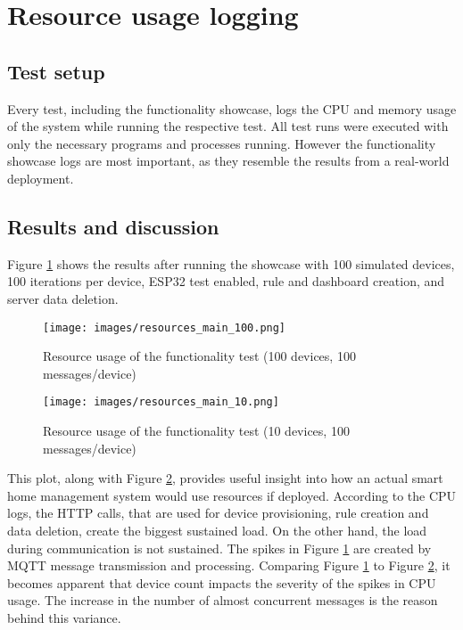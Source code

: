 \section{Resource usage logging}\label{chap:stat_log}
\subsection{Test setup}
Every test, including the functionality showcase, logs the CPU and memory usage of the system while running the respective test. All test runs were executed with only the necessary programs and processes running. However the functionality showcase logs are most important, as they resemble the results from a real-world deployment.

\subsection{Results and discussion}
Figure \ref{fig:resources_main_100} shows the results after running the showcase with 100 simulated devices, 100 iterations per device, ESP32 test enabled, rule and dashboard creation, and server data deletion. 

\begin{figure}[ht]
    \centering
    \texttt{[image: images/resources\_main\_100.png]}
    \caption{Resource usage of the functionality test (100 devices, 100 messages/device)}
    \label{fig:resources_main_100}
\end{figure}


\begin{figure}[ht]
    \centering
    \texttt{[image: images/resources\_main\_10.png]}
    \caption{Resource usage of the functionality test (10 devices, 100 messages/device)}
    \label{fig:resources_main_10}
\end{figure}


This plot, along with Figure \ref{fig:resources_main_10}, provides useful insight into how an actual smart home management system would use resources if deployed. According to the CPU logs, the HTTP calls, that are used for device provisioning, rule creation and data deletion, create the biggest sustained load. On the other hand, the load during communication is not sustained. The spikes in Figure \ref{fig:resources_main_100} are created by MQTT message transmission and processing. Comparing Figure \ref{fig:resources_main_100} to Figure \ref{fig:resources_main_10}, it becomes apparent that device count impacts the severity of the spikes in CPU usage. The increase in the number of almost concurrent messages is the reason behind this variance. 

